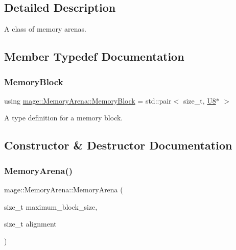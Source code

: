 \subsection{Detailed Description}
A class of memory arenas. 

\subsection{Member Typedef Documentation}
\mbox{\label{classmage_1_1_memory_arena_a133e9d40bd216e3f1d98c6a2b36cf373}} 
\subsubsection{\texorpdfstring{Memory\+Block}{MemoryBlock}}
{\footnotesize\ttfamily using \mbox{\hyperlink{classmage_1_1_memory_arena_a133e9d40bd216e3f1d98c6a2b36cf373}{mage\+::\+Memory\+Arena\+::\+Memory\+Block}} =  std\+::pair$<$ size\+\_\+t, \mbox{\hyperlink{namespacemage_a30677c03d683c4c35630c25f6ff3fb7f}{U8}}$\ast$ $>$\hspace{0.3cm}{\ttfamily [private]}}

A type definition for a memory block. 

\subsection{Constructor \& Destructor Documentation}
\mbox{\label{classmage_1_1_memory_arena_a139f7781be209bb29e7ad0ed04cb32a5}} 
\subsubsection{\texorpdfstring{Memory\+Arena()}{MemoryArena()}\hspace{0.1cm}{\footnotesize\ttfamily [1/3]}}
{\footnotesize\ttfamily mage\+::\+Memory\+Arena\+::\+Memory\+Arena (\begin{DoxyParamCaption}\item[{size\+\_\+t}]{maximum\+\_\+block\+\_\+size,  }\item[{size\+\_\+t}]{alignment }\end{DoxyParamCaption})\hspace{0.3cm}{\ttfamily [explicit]}}

